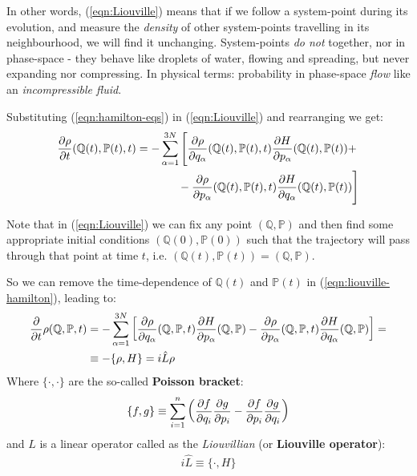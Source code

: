 \documentclass[../../main.tex]{subfiles}
\begin{document}
\medskip

In other words, (\ref{eqn:Liouville}) means that if we follow a system-point during its evolution, and measure the \textit{density} of other system-points travelling in its neighbourhood, we will find it unchanging. System-points \textit{do not}  together, nor  in phase-space - they behave like droplets of water, flowing and spreading, but never expanding nor compressing. In physical terms: probability in phase-space \textit{flow} like an \textit{incompressible fluid}.   

\medskip

Substituting (\ref{eqn:hamilton-eqs}) in (\ref{eqn:Liouville}) and rearranging we get:
\begin{align} \nonumber
    {\pdv{\rho}{t}} (\mathbb{Q}(t), \mathbb{P}(t),t) &= -\sum_{\alpha=1}^{3N} \Bigg[{\pdv{\rho}{q_\alpha}}    (\mathbb{Q}(t), \mathbb{P}(t),t) {\pdv{H}{p_\alpha}}  (\mathbb{Q}(t), \mathbb{P}(t)) + \\   &\quad\>\>\hphantom{\sum_{\alpha=1}^{3N}\Bigg[} - {\pdv{\rho}{p_\alpha}} (\mathbb{Q}(t), \mathbb{P}(t),t) {\pdv{H}{q_\alpha}} (\mathbb{Q}(t), \mathbb{P}(t))
    \Bigg] \label{eqn:liouville-hamilton} 
\end{align}

Note that in (\ref{eqn:Liouville}) we can fix any point $(\mathbb{Q},\mathbb{P})$ and then find some appropriate initial conditions $(\mathbb{Q}(0), \mathbb{P}(0))$ such that the trajectory will pass through that point at time $t$, i.e. $(\mathbb{Q}(t), \mathbb{P}(t)) = (\mathbb{Q},\mathbb{P})$. 

So we can remove the time-dependence of $\mathbb{Q}(t)$ and $\mathbb{P}(t)$ in (\ref{eqn:liouville-hamilton}), leading to:
\begin{align}\label{eqn:liouville-hamilton-no-dep}
    \pdv{t} \rho(\mathbb{Q},\mathbb{P},t) &= - \sum_{\alpha=1}^{3N} \left[{\pdv{\rho}{q_\alpha}}
     (\mathbb{Q},\mathbb{P},t) {\pdv{H}{p_\alpha}}  (\mathbb{Q},\mathbb{P})
    - {\pdv{\rho}{p_\alpha}} (\mathbb{Q},\mathbb{P},t) {\pdv{H}{q_\alpha}} (\mathbb{Q},\mathbb{P})
    \right] =\\ \nonumber
    &\equiv - \{\rho, H\} = i \hat{L} \rho
\end{align}
Where $\{\cdot, \cdot\}$ are the so-called \textbf{Poisson bracket}:
\begin{align*}
    \{f,g\} \equiv \sum_{i=1}^n \left(\pdv{f}{q_i} \pdv{g}{p_i} - \pdv{f}{p_i} \pdv{g}{q_i}\right)
\end{align*} 
and $\hat{L}$ is a linear operator called as the \textit{Liouvillian} (or \textbf{Liouville operator}):
\begin{align*}
    i \hat{L} \equiv \{\cdot, H\}
\end{align*}
\end{document}
